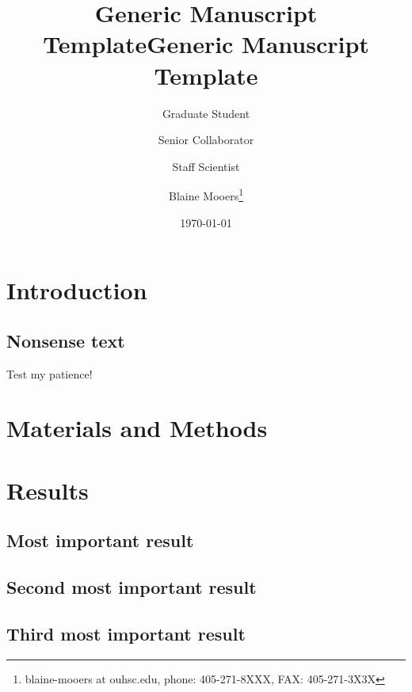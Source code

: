 \documentclass[11pt,letterpaper]{article}
\date{\today}
\title{Generic Manuscript Template}
\begin{document}
\author[1]{Graduate Student}
\author[2]{Senior Collaborator}
\author[3]{Staff Scientist}
\author[1,2,3]{Blaine Mooers\thanks{blaine-mooers at ouhsc.edu, phone: 405-271-8XXX, FAX: 405-271-3X3X}}
\title{Generic Manuscript Template}
\thispagestyle{plain}
\maketitle
{} %
\newpage
{}
\linenumbers


\section*{Introduction}
\label{sec:orgb85413a}
\subsection*{Nonsense text}
\label{sec:orga2dfe9f}

Test my patience!

\lipsum[1-10]


\section*{Materials and Methods}
\label{sec:orgd1cb652}

\section*{Results}
\label{sec:orge50933c}
\subsection*{Most important result}
\label{sec:orgb147343}


\subsection*{Second most important result}
\label{sec:orgbab96ee}


\subsection*{Third most important result}
\label{sec:org8af1abe}
\end{document}
